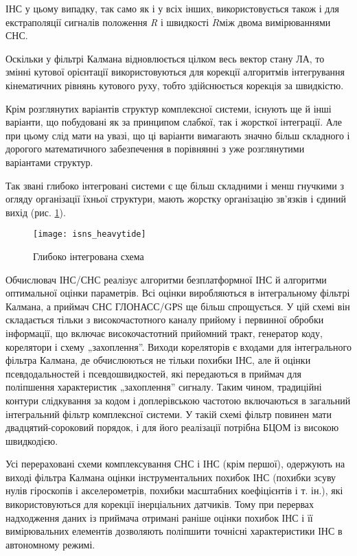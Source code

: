 ІНС у цьому випадку, так само як і у всіх інших, використовується також і для екстраполяції 
сигналів положення \textit{R} і швидкості $\dot{R}$між двома вимірюваннями СНС.

Оскільки у фільтрі Калмана відновлюється цілком весь вектор стану ЛА, то  змінні 
кутової орієнтації використовуються для корекції алгоритмів інтегрування кінематичних 
рівнянь кутового руху, тобто здійснюється корекція за швидкістю. 

Крім розглянутих варіантів структур комплексної системи, існують ще й інші варіанти, 
що побудовані як за принципом слабкої, так і жорсткої інтеграції. Але при цьому слід 
мати на увазі, що ці варіанти вимагають значно більш складного і дорогого математичного 
забезпечення в порівнянні з уже розглянутими варіантами структур.  

Так звані глибоко інтегровані системи є ще більш складними і менш гнучкими з огляду 
організації їхньої структури, мають жорстку організацію зв'язків і єдиний вихід (рис. 
\ref{fig:isns_heavytide}). 

\begin{figure}[here]
\centering
\texttt{[image: isns\_heavytide]}
\caption{Глибоко інтегрована схема}
\label{fig:isns_heavytide}
\end{figure}

Обчислювач ІНС/СНС реалізує алгоритми безплатформної ІНС й алгоритми оптимальної 
оцінки параметрів. Всі оцінки виробляються в інтегральному фільтрі Калмана, а приймач 
СНС ГЛОНАСС/GРS ще більш спрощується. У цій схемі він складається тільки з високочастотного 
каналу прийому і первинної обробки інформації, що включає високочастотний прийомний 
тракт, генератор коду, корелятори і схему „захоплення''. Виходи кореляторів є входами 
для інтегрального фільтра Калмана, де обчислюються не тільки похибки ІНС, але й оцінки 
псевдодальностей і псевдошвидкостей, які передаються в приймач для поліпшення характеристик 
„захоплення'' сигналу. Таким чином, традиційні контури слідкування за кодом і доплерівською 
частотою включаються в загальний інтегральний фільтр комплексної системи. У такій 
схемі фільтр повинен мати двадцятий-сороковий порядок, і для його реалізації потрібна 
БЦОМ із високою швидкодією.

Усі перераховані схеми комплексування СНС і ІНС (крім першої), одержують на виході 
фільтра Калмана оцінки інструментальних похибок ІНС (похибки зсуву нулів гіроскопів 
і акселерометрів, похибки масштабних коефіцієнтів і т. ін.), які використовуються 
для корекції інерціальних датчиків. Тому при перервах надходження даних із приймача 
отримані раніше оцінки похибок ІНС і її вимірювальних елементів дозволяють поліпшити 
точнісні характеристики ІНС в автономному режимі.


